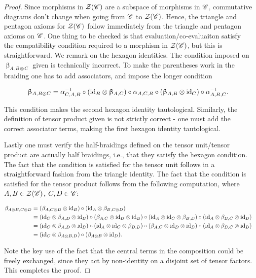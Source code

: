 \documentclass{article}
\theoremstyle{definition}
\numberwithin{figure}{section}
\begin{document}
\begin{proof} Since morphisms in $\mathcal{Z}(\mathscr{C})$ are a subspace of morphisms in $\mathscr{C}$, commutative diagrams don't change when going from $\mathscr{C}$ to $\mathcal{Z}(\mathscr{C})$. Hence, the triangle and pentagon axioms for $\mathcal{Z}(\mathscr{C})$ follow immediately from the triangle and pentagon axioms on $\mathscr{C}$. One thing to be checked is that evaluation/co-evaluaiton satisfy the compatibility condition required to a morphism in $\mathcal{Z}(\mathscr{C})$, but this is straightforward. We remark on the hexagon identities. The condition imposed on $\upbeta_{A,B\otimes C}$ given is technically incorrect. To make the parentheses work in the braiding one has to add associators, and impose the longer condition

$$\upbeta_{A,B\otimes C}=\alpha_{C,A,B}^{-1}\circ \left(\mathrm{id}_{B}\otimes \upbeta_{A,C}\right)\circ \alpha_{A,C,B}\circ\left(\upbeta_{A,B}\otimes \mathrm{id}_C\right)\circ \alpha^{-1}_{A,B,C}.$$

This condition makes the second hexagon identity tautological. Similarly, the definition of tensor product given is not strictly correct - one must add the correct associator terms, making the first hexagon identity tautological.

Lastly one must verify the half-braidings defined on the tensor unit/tensor product are actually half braidings, i.e., that they satisfy the hexagon condition. The fact that the condition is satisfied for the tensor unit follows in a straightforward fashion from the triangle identity. The fact that the condition is satisfied for the tensor product follows from the following computation, where $A,B\in \mathcal{Z}(\mathscr{C})$, $C,D\in \mathscr{C}$:

\begin{align*}
\beta_{A\otimes B,C\otimes D}&=(\beta_{A,C\otimes D}\otimes \mathrm{id}_{B})\circ (\mathrm{id}_{A}\otimes \beta_{B,C\otimes D})\\
&=(\mathrm{id}_{C}\otimes \beta_{A,D}\otimes \mathrm{id}_{B})\circ (\beta_{A,C}\otimes \mathrm{id}_{D}\otimes \mathrm{id}_{B})\circ (\mathrm{id}_{A}\otimes \mathrm{id}_{C}\otimes \beta_{B,D})\circ (\mathrm{id}_{A}\otimes \beta_{B,C}\otimes \mathrm{id}_{D})\\
&=(\mathrm{id}_{C}\otimes \beta_{A,D}\otimes \mathrm{id}_{B})\circ (\mathrm{id}_{A}\otimes \mathrm{id}_{C}\otimes \beta_{B,D})\circ (\beta_{A,C}\otimes \mathrm{id}_{D}\otimes \mathrm{id}_{B})\circ (\mathrm{id}_{A}\otimes \beta_{B,C}\otimes \mathrm{id}_{D})\\
&=(\mathrm{id}_{C}\otimes \beta_{A\otimes B,D})\circ (\beta_{A\otimes B}\otimes \mathrm{id}_{D}).
\end{align*}

Note the key use of the fact that the central terms in the composition could be freely exchanged, since they act by non-identity on a disjoint set of tensor factors. This completes the proof.

\end{proof}
\end{document}
